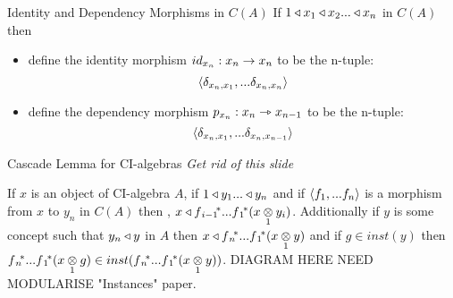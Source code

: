 \begin{frame}{Identity and Dependency Morphisms in $C(A)$}
If $1 \base x_1 \base x_2 ... \base x_n$ in $C(A)$
then 
\begin{itemize}
\item define the identity morphism $id_{x_n}:x_n \morph x_n$  
to be the n-tuple:
$$\tuple{\delta_{x_n,x_1},...\delta_{x_n,x_n}}$$
\item define the dependency morphism $p_{x_n}:x_n \smorph x_{n-1}$ to be the n-tuple:
$$\tuple{\delta_{x_n,x_1},...\delta_{x_n,x_{n-1}}}$$
\end{itemize}
\end{frame}

\begin{frame}{Cascade Lemma for CI-algebras }
\textit{\Large Get rid of this slide}

If $x$ is an object of CI-algebra $A$, if $1 \base y_1 ... \base y_n$ and 
if $\tuple{f_1,...f_n}$ is a morphism from $x$ to $y_n$ in $C(A)$ then \foreachi, $x \base \fipvectorstar(\crossx{x}{y_i}{1})$.
Additionally if $y$ is some concept such that $y_n \base y$ in $A$ then 
 $x \base \fnvectorstar(\crossx{x}{y}{1})$  and
if $g \in inst(y)$ 
then $\fnvectorstar(\crossx{x}{g}{1}) \in inst(\fnvectorstar(\crossx{x}{y}{1}))$.
DIAGRAM HERE NEED MODULARISE "Instances" paper.
\end{frame}

\iffalse{
\begin{frame}{Composition of morphisms}
Composition of morphisms is defined as follows.

$$\tuple{f_1,...f_n}\circ \tuple{g_1,...g_m} 
=\tuple{\fnvectorstar(\crossx{x}{g_1}{1}),...\fnvectorstar(\crossx{x}{g_m}{1})}
$$
\end{frame}
}\fi

